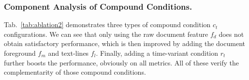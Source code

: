 \subsubsection{Component Analysis of Compound Conditions.}
Tab.~\ref{tab:ablation2} demonstrates three types of compound condition $c_t$ configurations. We can see that only using the raw document feature $f_d$ does not obtain satisfactory performance, which is then improved by adding the document foreground $f_m$ and text-lines $f_l$. Finally, adding a time-variant condition $r_t$ further boosts the performance, obviously on all metrics. All of these verify the complementarity of those compound conditions.  

\begin{table}[tp]
\centering\caption{Ablation study on different learning paradigms.}
\vspace{-5pt}
\label{tab:ablation1}
\end{table}



\begin{table}[tp]
\centering\caption{Ablation study for different conditions components}
\vspace{-5pt}
\label{tab:ablation2}
\end{table}



